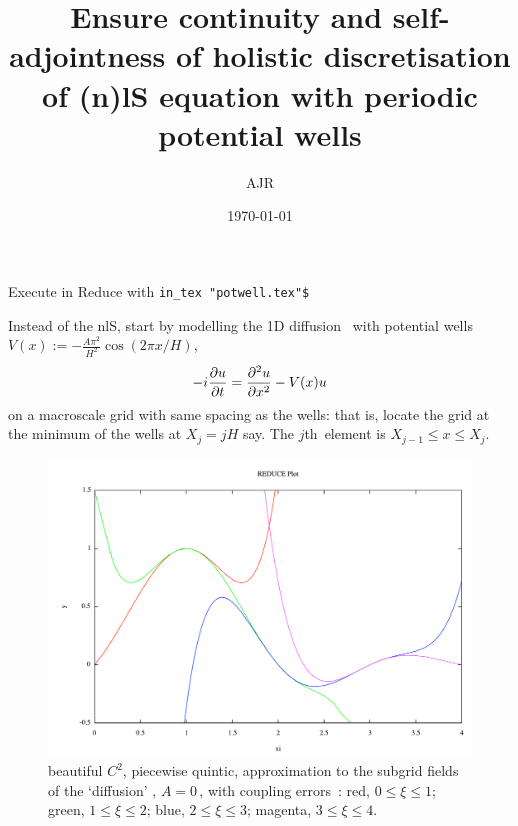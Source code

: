 \documentclass[12pt,a5paper]{article}
\title{Ensure continuity and self-adjointness of holistic discretisation of (n)lS equation with periodic potential wells}
\author{AJR}
\date{\today}
\begin{document}
\maketitle

Execute in Reduce with \verb|in_tex "potwell.tex"$|

Instead of the nlS, start by modelling the 1D diffusion \pde\ with potential wells \(V(x):=-\frac{A\pi^2}{H^2}\cos(2\pi x/H)\),
\begin{equation*}
-i\D tu=\DD xu-V(x)u
\end{equation*}
on a macroscale grid with same spacing as the wells: that is, locate the grid at the minimum of the wells at \(X_j=jH\) say.
The \(j\)th~element is \(X_{j-1}\leq x\leq X_j\).

\begin{figure}
\centering
\includegraphics[width=\linewidth]{A0gam3}
\caption{beautiful \(C^2\), piecewise quintic, approximation to the subgrid fields of the `diffusion' \pde, \(A=0\)\,, with coupling errors~: red, \(0\leq\xi\leq1\); green, \(1\leq\xi\leq2\); blue, \(2\leq\xi\leq3\); magenta, \(3\leq\xi\leq4\).}
\label{fig:A0gam3}
\end{figure}
\end{document}
